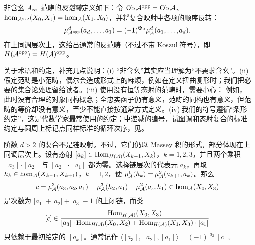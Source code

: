 \begin{definition*}
非含幺 $A_\infty$ 范畴的\emph{反范畴}定义如下：令 $\operatorname{Ob}\mathcal A^{\mathrm{opp}}=\operatorname{Ob}\mathcal A$、$\hom_{\mathcal A^{\mathrm{opp}}}(X_0,X_1)=\hom_{\mathcal A}(X_1,X_0)$，并将复合映射中各项的顺序反转：
\[
\mu^d_{\A^{\mathrm{opp}}}(a_d,\ldots,a_1)=(-1)^{\sgnmark_d}\mu^d_{\A}(a_1,\ldots,a_d).
\]
在上同调层次上，这给出通常的反范畴（不过不带 Koszul 符号），即 $H(\mathcal A^{\mathrm{opp}})=H(\mathcal A)^{\mathrm{opp}}$。
\end{definition*}

\begin{note}\label{st:1.1}
关于术语和约定，补充几点说明：(i) “非含幺”其实应当理解为“不要求含幺”。(ii) 假定范畴是小范畴，偶尔会造成形式上的麻烦，例如在定义扭曲复形时；我们把必要的集合论处理留给读者。(iii) 使用没有恒等态射的范畴时，需要小心：
例如，此时没有合理的对象同构概念；全忠实函子仍有意义，范畴的同构也有意义，但范畴的等价却没有意义，至少不能直接按通常方式定义。(iv) 我们的符号遵循“条形约定”，这是代数学家最常使用的约定；中递减的编号，试图调和态射复合的标准约定与圆周上标记点同样标准的循环次序，见。
\end{note}

\begin{note}\label{st:1.2}
阶数 $d>2$ 的复合不是链映射。不过，它们仍以 Massey 积的形式，部分体现在上同调层次上。设有态射 $[a_k]\in\operatorname{Hom}_{H(\mathcal A)}(X_{k-1},X_k)$，$k=1,2,3$，并且两个乘积 $[a_3]\cdot[a_2]$ 与 $[a_2]\cdot[a_1]$ 都为零。选择链层次的代表元 $a_k$，再取 $h_k\in\hom_{\mathcal A}(X_{k-1},X_{k+1})$，$k=1,2$，使 $\mu^1_{\mathcal A}(h_k)=\mu^2_{\mathcal A}(a_{k+1},a_k)$。那么
\[
c=\mu^3_{\mathcal A}(a_3,a_2,a_1)-\mu^2_{\mathcal A}(h_2,a_1)-\mu^2_{\mathcal A}(a_3,h_1)\in\hom_{\mathcal A}(X_0,X_3)
\]
是次数为 $|a_1|+|a_2|+|a_3|-1$ 的上闭链，而类
\begin{equation}\label{eq:1.4}
[c]\in\frac{\operatorname{Hom}_{H(\mathcal A)}(X_0,X_3)}{[a_3]\cdot\operatorname{Hom}_{H(\mathcal A)}(X_0,X_2)+\operatorname{Hom}_{H(\mathcal A)}(X_1,X_3)\cdot[a_1]}
\end{equation}
只依赖于最初给定的 $[a_k]$。通常记作 $\langle[a_3],[a_2],[a_1]\rangle=(-1)^{|a_2|}[c]$。
\end{note}

